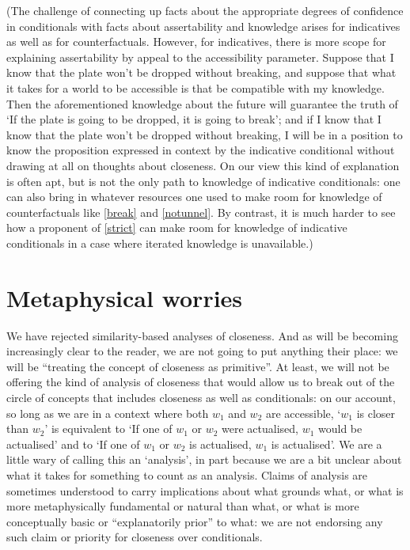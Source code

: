 \documentclass[If.tex]{subfiles}
\begin{document}
(The challenge of connecting up facts about the appropriate degrees of confidence in conditionals with facts about assertability and knowledge arises for indicatives as well as for counterfactuals. However, for indicatives, there is more scope for explaining assertability by appeal to the accessibility parameter. Suppose that I know that the plate won't be dropped without breaking, and suppose that what it takes for a world to be accessible is that be compatible with my knowledge. Then the aforementioned knowledge about the future will guarantee the truth of ‘If the plate is going to be dropped, it is going to break’; and if I know that I know that the plate won't be dropped without breaking, I will be in a position to know the proposition expressed in context by the indicative conditional without drawing at all on thoughts about closeness. On our view this kind of explanation is often apt, but is not the only path to knowledge of indicative conditionals: one can also bring in whatever resources one used to make room for knowledge of counterfactuals like \ref{break} and \ref{notunnel}. By contrast, it is much harder to see how a proponent of \ref{strict} can make room for knowledge of indicative conditionals in a case where iterated knowledge is unavailable.)

\section{Metaphysical worries}
We have rejected similarity-based analyses of closeness. And as will be becoming increasingly clear to the reader, we are not going to put anything their place: we will be “treating the concept of closeness as primitive”. At least, we will not be offering the kind of analysis of closeness that would allow us to break out of the circle of concepts that includes closeness as well as conditionals: on our account, so long as we are in a context where both $w_1$ and $w_2$ are accessible, ‘$w_1$ is closer than $w_2$’ is equivalent to ‘If one of $w_1$ or $w_2$ were actualised, $w_1$ would be actualised’ and to ‘If one of $w_1$ or $w_2$ is actualised, $w_1$ is actualised’. We are a little wary of calling this an ‘analysis’, in part because we are a bit unclear about what it takes for something to count as an analysis. Claims of analysis are sometimes understood to carry implications about what grounds what, or what is more metaphysically fundamental or natural than what, or what is more conceptually basic or “explanatorily prior” to what: we are not endorsing any such claim or priority for closeness over conditionals.
\end{document}
